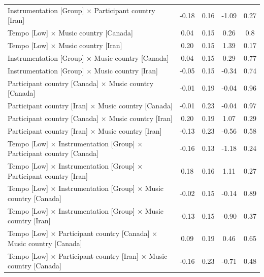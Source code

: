\documentclass[
  bookmarksnumbered]{article}
\begin{document}
\begin{table}[H]
{\begin{tabular}[t]{lcccc}
\hspace{1em}Instrumentation [Group] × Participant country [Iran] & -0.18 & 0.16 & -1.09 & 0.27\\
\hspace{1em}Tempo [Low] × Music country [Canada] & 0.04 & 0.15 & 0.26 & 0.8\\
\hspace{1em}Tempo [Low] × Music country [Iran] & 0.20 & 0.15 & 1.39 & 0.17\\
\hspace{1em}Instrumentation [Group] × Music country [Canada] & 0.04 & 0.15 & 0.29 & 0.77\\
\hspace{1em}Instrumentation [Group] × Music country [Iran] & -0.05 & 0.15 & -0.34 & 0.74\\
\hspace{1em}Participant country [Canada] × Music country [Canada] & -0.01 & 0.19 & -0.04 & 0.96\\
\hspace{1em}Participant country [Iran] × Music country [Canada] & -0.01 & 0.23 & -0.04 & 0.97\\
\hspace{1em}Participant country [Canada] × Music country [Iran] & 0.20 & 0.19 & 1.07 & 0.29\\
\hspace{1em}Participant country [Iran] × Music country [Iran] & -0.13 & 0.23 & -0.56 & 0.58\\
\hspace{1em}Tempo [Low] × Instrumentation [Group] × Participant country [Canada] & -0.16 & 0.13 & -1.18 & 0.24\\
\hspace{1em}Tempo [Low] × Instrumentation [Group] × Participant country [Iran] & 0.18 & 0.16 & 1.11 & 0.27\\
\hspace{1em}Tempo [Low] × Instrumentation [Group] × Music country [Canada] & -0.02 & 0.15 & -0.14 & 0.89\\
\hspace{1em}Tempo [Low] × Instrumentation [Group] × Music country [Iran] & -0.13 & 0.15 & -0.90 & 0.37\\
\hspace{1em}Tempo [Low] × Participant country [Canada] × Music country [Canada] & 0.09 & 0.19 & 0.46 & 0.65\\
\hspace{1em}Tempo [Low] × Participant country [Iran] × Music country [Canada] & -0.16 & 0.23 & -0.71 & 0.48\\

\end{tabular}}
\end{table}
\end{document}
